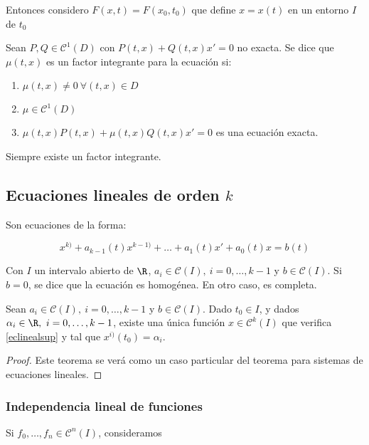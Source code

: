 Entonces considero  $F(x,t) = F(x_0, t_0)$ que define $x=x(t)$ en un entorno $I$ de $t_0$


\begin{ndef}
Sean $P,Q \in \mathscr{C}^1 (D)$ con $P(t,x) + Q(t,x) x' = 0$ no exacta. Se dice que $\mu (t,x)$ es un factor integrante para la ecuación si:
\begin{enumerate}
\item $\mu(t,x) \neq 0 \ \forall (t,x) \in D$
\item $\mu \in \mathscr{C}^1 (D)$
\item $\mu (t,x)P(t,x) + \mu (t,x)Q(t,x) x' = 0$ es una ecuación exacta.
\end{enumerate}

\begin{nota}
  Siempre existe un factor integrante.
\end{nota}

\end{ndef}

\subsection{Ecuaciones lineales de orden $k$}

Son ecuaciones de la forma:

\[ 
  x^{k)} + a_{k-1}(t)x^{k-1)} + \dots + a_1(t)x' + a_0(t)x = b(t) \tag{L} \label{eclinealsup}
\]

Con $I$ un intervalo abierto de $\R$, $a_i \in \mathscr{C}(I), \ i=0,\dots,k-1$ y $b\in \mathscr{C}(I)$.
Si $b = 0$, se dice que la ecuación es homogénea. En otro caso, es completa.

\begin{nth} \label{unicidadeclinsup}
  Sean $a_i \in \mathscr{C}(I), \ i=0,\dots,k-1$ y $b\in \mathscr{C}(I)$. Dado $t_0\in I$, y dados $\alpha_i\in\R, \ i=0,\dots,k-1$,
  existe una única función $x\in\mathscr{C}^k(I)$ que verifica \eqref{eclinealsup} y tal que $x^{i)}(t_0) = \alpha_i$.
\end{nth}

\begin{proof}
  Este teorema se verá como un caso particular del teorema para sistemas de ecuaciones lineales.
\end{proof}

\subsubsection{Independencia lineal de funciones}
Si $f_0, \dots, f_n\in \mathscr{C}^n(I)$, consideramos


